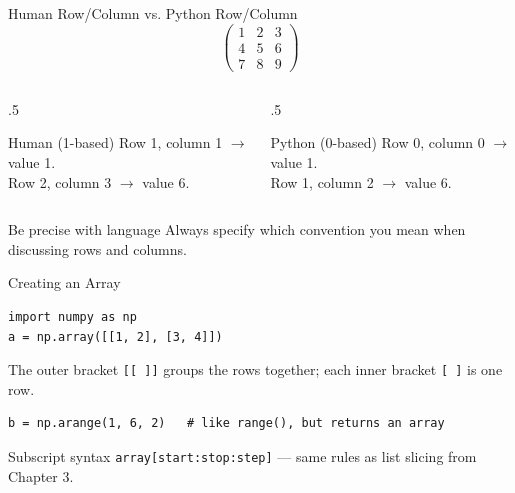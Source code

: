 \documentclass[9pt,aspectratio=169,xcolor=table]{beamer}
\begin{document}
\begin{frame}{Human Row/Column vs. Python Row/Column}
    \leavevmode
    \[
    \begin{pmatrix}
    1 & 2 & 3 \\
    4 & 5 & 6 \\
    7 & 8 & 9
    \end{pmatrix}
    \]

    \vspace{2mm}
    \begin{columns}[t]
        \begin{column}{.5\textwidth}
            \begin{block}{Human (1-based)}
                \small Row 1, column 1 $\to$ value 1. \\
                Row 2, column 3 $\to$ value 6.
            \end{block}
        \end{column}
        \begin{column}{.5\textwidth}
            \begin{block}{Python (0-based)}
                \small Row 0, column 0 $\to$ value 1. \\
                Row 1, column 2 $\to$ value 6.
            \end{block}
        \end{column}
    \end{columns}

    \vspace{2mm}
    \begin{alertblock}{Be precise with language}
        Always specify which convention you mean when discussing rows
        and columns.
    \end{alertblock}
\end{frame}

\begin{frame}[fragile]{Creating an Array}
    \leavevmode
\begin{lstlisting}
import numpy as np
a = np.array([[1, 2], [3, 4]])
\end{lstlisting}

    \vspace{1mm}
    {\small The outer bracket \texttt{[[~]]} groups the rows together;
    each inner bracket \texttt{[~]} is one row.}

\begin{lstlisting}
b = np.arange(1, 6, 2)   # like range(), but returns an array
\end{lstlisting}

    \vspace{2mm}
    \begin{block}{Subscript syntax}
        \texttt{array[start:stop:step]} --- same rules as list slicing
        from Chapter 3.
    \end{block}
\end{frame}
\end{document}
